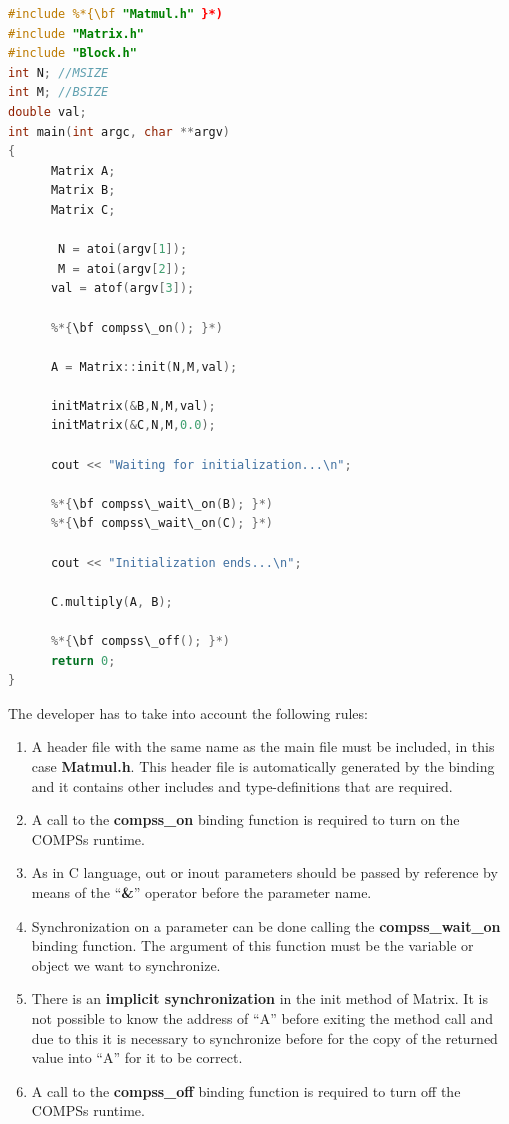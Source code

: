 \begin{lstlisting}[language=C++]
#include %*{\bf "Matmul.h" }*)
#include "Matrix.h"
#include "Block.h"
int N; //MSIZE
int M; //BSIZE
double val;
int main(int argc, char **argv)
{
      Matrix A;
      Matrix B;
      Matrix C;

       N = atoi(argv[1]);
       M = atoi(argv[2]);
      val = atof(argv[3]);

      %*{\bf compss\_on(); }*)

      A = Matrix::init(N,M,val);

      initMatrix(&B,N,M,val);
      initMatrix(&C,N,M,0.0);

      cout << "Waiting for initialization...\n";

      %*{\bf compss\_wait\_on(B); }*)
      %*{\bf compss\_wait\_on(C); }*)

      cout << "Initialization ends...\n";
 
      C.multiply(A, B);

      %*{\bf compss\_off(); }*)
      return 0;
}
\end{lstlisting}

The developer has to take into account the following rules:
\begin{enumerate}
 \item A header file with the same name as the main file must be included, in this case {\bf Matmul.h}. 
       This header file is automatically generated by the binding and it contains other includes and 
        type-definitions that are required.
 \item A call to the {\bf compss\_on} binding function is required to turn on the COMPSs runtime.
 \item As in C language, out or inout parameters should be passed by reference by means of the ``{\bf \&}'' 
       operator before the parameter name.
 \item Synchronization on a parameter can be done calling the {\bf compss\_wait\_on} binding function. 
       The argument of this function must be the variable or object we want to synchronize.
 \item There is an {\bf implicit synchronization} in the init method of Matrix. It is not possible to 
       know the address of ``A'' before exiting the method call and due to this it is necessary to synchronize 
       before for the copy of the returned value into ``A'' for it to be correct.
 \item A call to the {\bf compss\_off} binding function is required to turn off the COMPSs runtime.
\end{enumerate}


